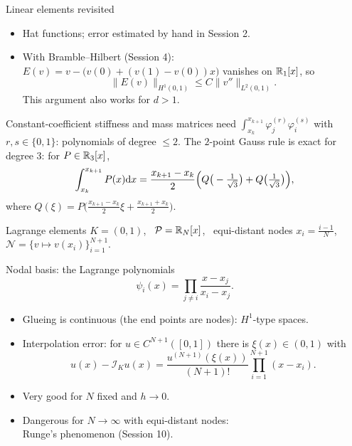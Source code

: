\begin{frame}{Linear elements revisited}
    \begin{itemize}
        \item Hat functions; error estimated by hand in Session 2.
        \item With Bramble--Hilbert (Session 4): $E(v) = v - \big(v(0) + (v(1) - v(0))x\big)$ vanishes on ${\mathbb R}_1[x]$, so
              \[
                  \|E(v)\|_{H^1(0,1)} \le C \|v''\|_{L^2(0,1)} .
              \]
              This argument also works for $d > 1$.
    \end{itemize}
    \begin{remark}
        Constant-coefficient stiffness and mass matrices need $\int_{x_k}^{x_{k+1}} \varphi_j^{(r)} \varphi_i^{(s)}$ with $r,s \in \{0,1\}$: polynomials of degree $\le 2$.
        The $2$-point Gauss rule is exact for degree $3$: for $P \in {\mathbb R}_3[x]$,
        \[
            \int_{x_k}^{x_{k+1}} P(x) {\mathrm d} x = \frac{x_{k+1} - x_k}{2}\Big( Q\big(-\tfrac{1}{\sqrt3}\big) + Q\big(\tfrac{1}{\sqrt 3}\big) \Big),
        \]
        where $Q(\xi) = P\big(\frac{x_{k+1} - x_k}{2}\xi + \frac{x_{k+1} + x_k}{2}\big)$.
    \end{remark}
\end{frame}

\begin{frame}{Lagrange elements}
    $K = (0,1)$, \ $\mathcal P = {\mathbb R}_N[x]$, \ equi-distant nodes $x_i = \frac{i-1}{N}$, \ $\mathcal N = \{ v \mapsto v(x_i) \}_{i=1}^{N+1}$.
    \medskip

    Nodal basis: the Lagrange polynomials
    \[
        \psi_i(x) = \prod_{j \ne i} \frac{x - x_j}{x_i - x_j}.
    \]
    \begin{itemize}
        \item Glueing is continuous (the end points are nodes): $H^1$-type spaces.
        \item Interpolation error: for $u \in C^{N+1}([0,1])$ there is $\xi(x) \in (0,1)$ with
              \[
                  u(x) - \mathcal I_K u(x) = \frac{u^{(N+1)}(\xi(x))}{(N+1)!} \prod_{i=1}^{N+1} (x - x_i).
              \]
        \item Very good for $N$ fixed and $h \to 0$.
        \item Dangerous for $N \to \infty$ with equi-distant nodes:\\ \alert{Runge's phenomenon} (Session 10).
    \end{itemize}
\end{frame}

